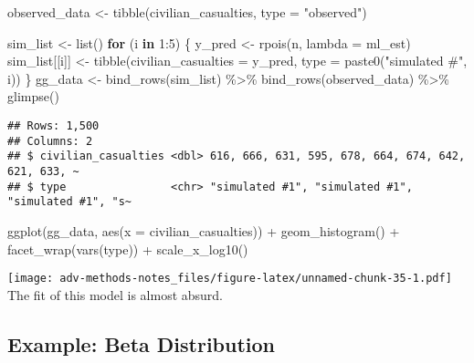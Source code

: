\documentclass[
]{book}
\newenvironment{Shaded}{\begin{snugshade}}{\end{snugshade}}
\newcommand{\AttributeTok}[1]{\textcolor[rgb]{0.77,0.63,0.00}{#1}}
\newcommand{\ControlFlowTok}[1]{\textcolor[rgb]{0.13,0.29,0.53}{\textbf{#1}}}
\newcommand{\DecValTok}[1]{\textcolor[rgb]{0.00,0.00,0.81}{#1}}
\newcommand{\FunctionTok}[1]{\textcolor[rgb]{0.00,0.00,0.00}{#1}}
\newcommand{\NormalTok}[1]{#1}
\newcommand{\OtherTok}[1]{\textcolor[rgb]{0.56,0.35,0.01}{#1}}
\newcommand{\SpecialCharTok}[1]{\textcolor[rgb]{0.00,0.00,0.00}{#1}}
\newcommand{\StringTok}[1]{\textcolor[rgb]{0.31,0.60,0.02}{#1}}
\begin{document}
\begin{Shaded}
\begin{Highlighting}[]
\NormalTok{observed\_data }\OtherTok{\textless{}{-}} \FunctionTok{tibble}\NormalTok{(civilian\_casualties, }\AttributeTok{type =} \StringTok{"observed"}\NormalTok{)}

\NormalTok{sim\_list }\OtherTok{\textless{}{-}} \FunctionTok{list}\NormalTok{()}
\ControlFlowTok{for}\NormalTok{ (i }\ControlFlowTok{in} \DecValTok{1}\SpecialCharTok{:}\DecValTok{5}\NormalTok{) \{}
\NormalTok{  y\_pred }\OtherTok{\textless{}{-}} \FunctionTok{rpois}\NormalTok{(n, }\AttributeTok{lambda =}\NormalTok{ ml\_est)}
\NormalTok{  sim\_list[[i]] }\OtherTok{\textless{}{-}} \FunctionTok{tibble}\NormalTok{(}\AttributeTok{civilian\_casualties =}\NormalTok{ y\_pred, }
                          \AttributeTok{type =} \FunctionTok{paste0}\NormalTok{(}\StringTok{"simulated \#"}\NormalTok{, i))}
\NormalTok{\}}
\NormalTok{gg\_data }\OtherTok{\textless{}{-}} \FunctionTok{bind\_rows}\NormalTok{(sim\_list) }\SpecialCharTok{\%\textgreater{}\%}
  \FunctionTok{bind\_rows}\NormalTok{(observed\_data) }\SpecialCharTok{\%\textgreater{}\%}
  \FunctionTok{glimpse}\NormalTok{()}
\end{Highlighting}
\end{Shaded}

\begin{verbatim}
## Rows: 1,500
## Columns: 2
## $ civilian_casualties <dbl> 616, 666, 631, 595, 678, 664, 674, 642, 621, 633, ~
## $ type                <chr> "simulated #1", "simulated #1", "simulated #1", "s~
\end{verbatim}

\begin{Shaded}
\begin{Highlighting}[]
\FunctionTok{ggplot}\NormalTok{(gg\_data, }\FunctionTok{aes}\NormalTok{(}\AttributeTok{x =}\NormalTok{ civilian\_casualties)) }\SpecialCharTok{+} 
  \FunctionTok{geom\_histogram}\NormalTok{() }\SpecialCharTok{+} 
  \FunctionTok{facet\_wrap}\NormalTok{(}\FunctionTok{vars}\NormalTok{(type)) }\SpecialCharTok{+} 
  \FunctionTok{scale\_x\_log10}\NormalTok{()}
\end{Highlighting}
\end{Shaded}

\texttt{[image: adv-methods-notes\_files/figure-latex/unnamed-chunk-35-1.pdf]}
The fit of this model is almost absurd.

\hypertarget{example-beta-distribution-2}{%
\subsection{Example: Beta
Distribution}\label{example-beta-distribution-2}}
\end{document}
